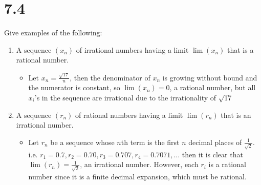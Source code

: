 \documentclass[10pt,a4paper]{article}
\theoremstyle{definition}
\begin{document}
\section*{7.4}
Give examples of the following:
\begin{enumerate}[label = (\alph*)]
\item A sequence $(x_n)$ of irrational numbers having a limit $\lim(x_n)$ that is a rational number.
	\begin{itemize}
	\item Let $\displaystyle x_n = \frac{\sqrt{17}}{n}$, then the denominator of $x_n$ is growing without bound and the numerator is constant, so $\lim(x_n) = 0$, a rational number, but all $x_i$'s in the sequence are irrational due to the irrationality of $\sqrt{17}$
	\end{itemize}
\item A sequence $(r_n)$ of rational numbers having a limit $\lim(r_n)$ that is an irrational number.
	\begin{itemize}
	\item Let $r_n$ be a sequence whose $n$th term is the first $n$ decimal places of $\frac{1}{\sqrt{2}}$. i.e. $r_1 = 0.7, r_2 = 0.70, r_3 = 0.707, r_4 = 0.7071, \ldots$ then it is clear that $\lim(r_n) = \frac{1}{\sqrt{2}}$, an irrational number. However, each $r_i$ is a rational number since it is a finite decimal expansion, which must be rational. 
	\end{itemize}
\end{enumerate}
\end{document}
